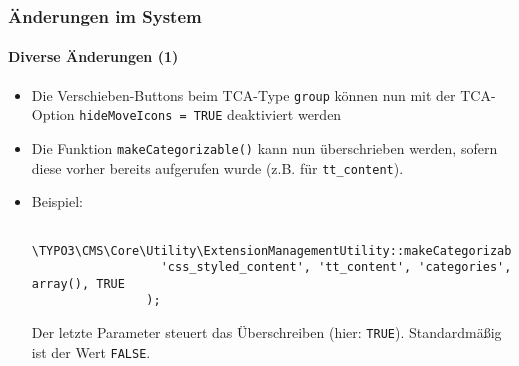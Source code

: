 \begin{frame}[fragile]
	\frametitle{Änderungen im System}
	\framesubtitle{Diverse Änderungen (1)}

	\begin{itemize}

		\item Die Verschieben-Buttons beim TCA-Type \texttt{group} können
			nun mit der TCA-Option \texttt{hideMoveIcons = TRUE} deaktiviert werden

		\item Die Funktion \texttt{makeCategorizable()} kann nun überschrieben werden,
			sofern diese vorher bereits aufgerufen wurde (z.B. für \texttt{tt\_content}).

		\item Beispiel:

			\begin{lstlisting}
				\TYPO3\CMS\Core\Utility\ExtensionManagementUtility::makeCategorizable(
				  'css_styled_content', 'tt_content', 'categories', array(), TRUE
				);
			\end{lstlisting}

			\small
				Der letzte Parameter steuert das Überschreiben (hier: \texttt{TRUE}).\newline
				Standardmäßig ist der Wert \texttt{FALSE}.
			\normalsize

	\end{itemize}

\end{frame}


